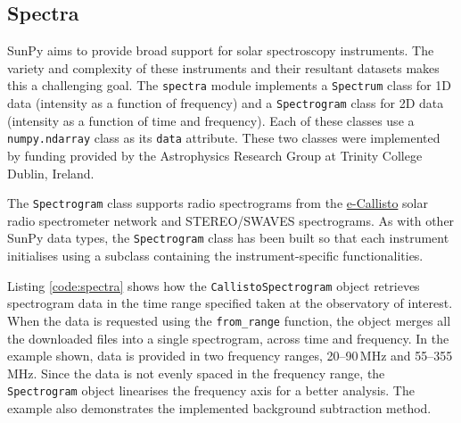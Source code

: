 \subsection{Spectra}\label{sec:spectra}

SunPy aims to provide broad support for solar spectroscopy
instruments.  The variety and complexity of these instruments and
their resultant datasets makes this a challenging goal.  The \texttt{spectra} module implements a
\texttt{Spectrum} class for 1D data (intensity as a function of frequency) and a
\texttt{Spectrogram} class for 2D data (intensity as a function of time and
frequency).  Each of these classes use a \texttt{numpy.ndarray} class
as its \texttt{data} attribute.  These two classes were implemented
by funding provided by the Astrophysics Research Group at Trinity
College Dublin, Ireland.

The \texttt{Spectrogram} class supports radio spectrograms from the 
\href{http://www.e-callisto.org/}{e-Callisto}
solar radio spectrometer network and STEREO/SWAVES spectrograms.
As with other SunPy data types, the \texttt{Spectrogram} class has been
built so that each instrument initialises using a subclass containing the instrument-specific 
functionalities.

Listing \ref{code:spectra} shows how the \texttt{CallistoSpectrogram}
object retrieves spectrogram data in the time range specified taken at
the observatory of interest.  When the data is requested using the
\texttt{from\_range} function, the object merges all the downloaded
files into a single spectrogram, across time and frequency.
In the example shown, data is provided in two frequency ranges, 
20--90\,MHz and 55--355\,MHz.  Since the data is not evenly spaced in
the frequency range, the \texttt{Spectrogram} object linearises the
frequency axis for a better analysis.  The example also demonstrates
the implemented background subtraction method.

